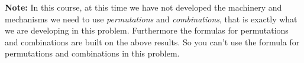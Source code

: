 \documentclass[a4paper]{exam}
\begin{document}
\begin{questions}

    \textbf{Note:} In this course, at this time we have not developed the machinery and mechanisms we need to use \emph{permutations} and \emph{combinations}, that is exactly what we are developing in this problem. Furthermore the formulas for permutations and combinations are built on the above results. So you can't use the formula for permutations and combinations in this problem. 
\end{questions}
\end{document}
